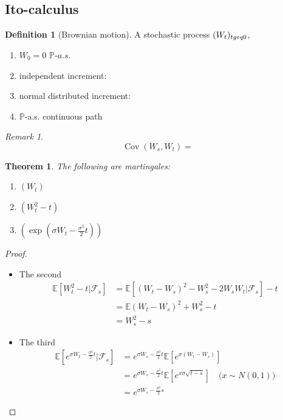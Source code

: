 \documentclass[a4paper,11pt]{book}
\newtheorem{theorem}{Theorem}[section]
\theoremstyle{definition}
\newtheorem{definition}{Definition}[section]
\theoremstyle{remark}
\newtheorem*{remark}{Remark}
\DeclareMathOperator{\cov}{Cov}
\begin{document}
\subsection{Ito-calculus}
\begin{definition}[Brownian motion]
	A stochastic process $(W_t)_{t \\geq 0}$, 
	\begin{enumerate}
		\item $W_0 = 0$ $\mathbb{P}$-$a.s.$
		\item independent increment:
		\item normal distributed increment:
		\item $\mathbb{P}$-a.s. continuous path
	\end{enumerate}
\end{definition}
\begin{remark}
\begin{equation*}
	\cov(W_s, W_t) =  
\end{equation*}	
\end{remark}

\begin{theorem}
	 The following are martingales:
	 \begin{enumerate}
	 	\item $(W_t)$
	 	\item $(W_t^2 - t)$
	 	\item $\left(\exp(\sigma W_t - \frac{\sigma^2}{2}t)\right)$
	 \end{enumerate}
\end{theorem}
\begin{proof}\quad
	\begin{itemize}
		\item The second
		\begin{align*}
			\mathbb{E}[W_t^2 - t|\mathcal{F}_s] &= \mathbb{E}[(W_t - W_s)^2 - W_s^2 - 2W_sW_t|\mathcal{F}_s] - t\\
			&= \mathbb{E}(W_t-W_s)^2 + W_s^2 - t\\
			&= W_s^2 - s
		\end{align*}
		 
		\item The third
		\begin{align*}
			\mathbb{E}[e^{\sigma W_t - \frac{\sigma^2}{2}t} |\mathcal{F}_s] &= e^{\sigma W_s - \frac{\sigma^2}{2}t}\mathbb{E}[e^{\sigma(W_t - W_s)}]\\
			&= e^{\sigma W_s - \frac{\sigma^2}{2}t}\mathbb{E}[e^{x\sigma \sqrt{t-s}}] \quad \text{($x \sim N(0, 1)$)}\\
			&= e^{\sigma W_s - \frac{\sigma^2}{2}s}
		\end{align*}
	\end{itemize}
\end{proof}
\end{document}

